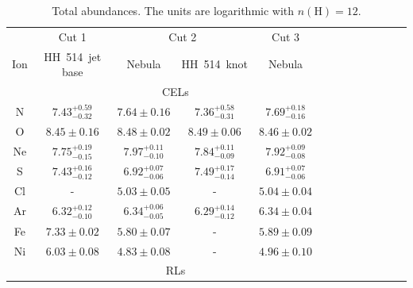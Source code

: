 \documentclass[fleqn,usenatbib]{mnras}
\newcommand{\jorge}[1]{{\color{magenta}J: #1}}
\begin{document}


\begin{table}
\centering
\caption{Total abundances. The units are logarithmic with $n(\text{H})=12$.}
\label{tab:total_abundances}
\begin{tabular}{ccccccccccccc}
\hline
 & \multicolumn{1}{c}{Cut 1} & \multicolumn{2}{c}{Cut 2} & \multicolumn{1}{c}{Cut 3} & \\
Ion &  HH~514~jet base & Nebula & HH~514~knot  & Nebula \\
\hline
 & \multicolumn{4}{c}{CELs}\\

N  & $7.43 ^{+0.59} _{-0.32}$ & $7.64 \pm 0.16$ &$7.36 ^{+0.58} _{-0.31}$ & $7.69 ^{+0.18} _{-0.16}$ \\ 

O  & $8.45 \pm 0.16$ & $8.48 \pm 0.02$ &$8.49 \pm 0.06$&$8.46 \pm 0.02$\\

Ne & $7.75 ^{+0.19} _{-0.15}$ & $7.97 ^{+0.11} _{-0.10}$& $7.84 ^{+0.11} _{-0.09}$ & $7.92 ^{+0.09} _{-0.08}$ \\ 

S  & $7.43 ^{+0.16} _{-0.12}$ & $6.92 ^{+0.07} _{-0.06}$& $7.49 ^{+0.17} _{-0.14}$ &$6.91 ^{+0.07} _{-0.06}$\\

Cl & - & $5.03 \pm 0.05$&- &$5.04 \pm 0.04$\\

Ar & $6.32 ^{+0.12} _{-0.10}$ & $6.34 ^{+0.06} _{-0.05}$ & $6.29 ^{+0.14} _{-0.12}$& $6.34 \pm 0.04$\\

Fe & $7.33 \pm 0.02$ & $5.80 \pm 0.07$ & - &$5.89 \pm 0.09$\\


Ni & $6.03 \pm 0.08$ & $4.83 \pm 0.08 $&-&$4.96 \pm 0.10$\\

 & \multicolumn{4}{c}{RLs}\\


\end{tabular}
\end{table}
\end{document}
